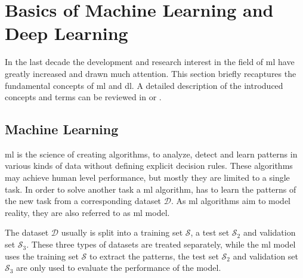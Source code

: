 
\section{Basics of Machine Learning and Deep Learning}\label{ord:ch2:sec1}

In the last decade the development and research interest in the field of \gls{ml} have greatly increased and drawn much attention. 
This section briefly recaptures the fundamental concepts of \gls{ml} and \gls{dl}.
A detailed description of the introduced concepts and terms can be reviewed in \cite{Ger17-HandsOn} or \cite{Goodfellow-et-al-2016}.


\subsection{Machine Learning}\label{ord:ch2:sec1:subsec1}

\gls{ml} is the science of creating algorithms, to analyze, detect and learn patterns in various kinds of data without defining explicit decision rules.
These algorithms may achieve human level performance, but mostly they are limited to a single task.
In order to solve another task a \gls{ml} algorithm, has to learn the patterns of the new task from a corresponding dataset $\mathcal{D}$.
As \gls{ml} algorithms aim to model reality, they are also referred to as \gls{ml} model.

The dataset $\mathcal{D}$ usually is split into a training set $\mathcal{S}$, a test set $\mathcal{S}_2$ and validation set $\mathcal{S}_3$.
These three types of datasets are treated separately, while the \gls{ml} model uses the training set $\mathcal{S}$ to extract the patterns, the test set $\mathcal{S}_2$ and validation set $\mathcal{S}_3$ are only used to evaluate the performance of the model.


